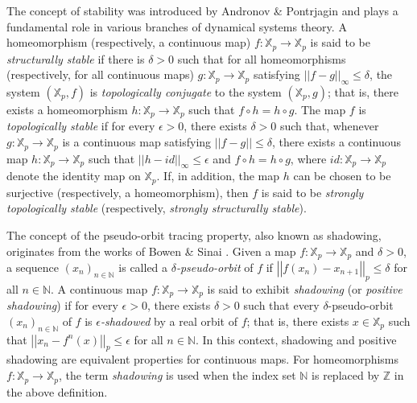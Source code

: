 \documentclass[a4paper, 12pt]{article}
\theoremstyle{definition}
\begin{document}
	
	\smallskip
	The concept of stability was introduced by Andronov \& Pontrjagin \cite{Andronov_Pontrjagin-Systemes_Grossiers} and plays a fundamental role in various branches of dynamical systems theory. 
	A homeomorphism (respectively, a continuous map) $ f: \mathbb{X}_{p} \to \mathbb{X}_{p}$ is said to be \textit{structurally stable} if there is $\delta > 0$ such that for all homeomorphisms (respectively, for all continuous maps) $g: \mathbb{X}_{p} \to \mathbb{X}_{p}$ satisfying $ \left| \left|  f - g  \right|  \right|_{ \infty } \le \delta$, the system $ \left(  \mathbb{X}_{p}, f  \right) $ is \textit{topologically conjugate} to the system $ \left(  \mathbb{X}_{p}, g  \right) $; that is, there exists a homeomorphism $h: \mathbb{X}_{p} \to \mathbb{X}_{p}$ such that $f \circ h= h \circ g$. 
	The map $f$ is \textit{topologically stable} if for every $ \epsilon  > 0$, there exists $\delta  > 0$ such that, whenever $g: \mathbb{X}_{p} \to \mathbb{X}_{p}$ is a continuous map satisfying $ \left| \left|  f - g  \right| \right|  \le \delta$, there exists a continuous map $h: \mathbb{X}_{p} \to \mathbb{X}_{p}$ such that $ \left| \left|  h - id  \right|  \right|_{ \infty } \le  \epsilon $ and $ f \circ h = h \circ g$, where $id: \mathbb{X}_{p} \to \mathbb{X}_{p}$ denote the identity map on $\mathbb{X}_{p}$. 
	If, in addition, the map $h$ can be chosen to be surjective (respectively, a homeomorphism), then $f$ is said to be \textit{strongly topologically stable} (respectively, \textit{strongly structurally stable}). 
	
	\smallskip
	
	The concept of the pseudo-orbit tracing property, also known as shadowing, originates from the works of Bowen \cite{Bowen-Omega-limit_Sets_for_Axiom-A_Diffeomorphisms} \& Sinai \cite{Sinai-Gibbs_Measures_in_Ergodic_Theory}. Given a map $f: \mathbb{X}_{p} \to \mathbb{X}_{p}$ and $\delta  > 0$, a sequence $ \left(  x_{n}   \right)_{n \in \mathbb{N} }$ is called a \textit{$\delta$-pseudo-orbit} of $f$ if $ \left| \left|  f \left(  x_{n}  \right)  - x_{n+1}  \right|  \right|_{p} \le \delta $ for all $ n \in \mathbb{N} $.   
	A continuous map $f: \mathbb{X}_{p} \to \mathbb{X}_{p} $ is said to exhibit \textit{shadowing} (or \textit{positive shadowing}) if for every $\epsilon > 0$, there exists $\delta > 0$ such 
	that every $\delta$-pseudo-orbit $ \left(  x_n   \right)_{n \in\mathbb{N} }$ of $f$ is \textit{$\epsilon$-shadowed} by a real orbit of $f$; that is, there exists 
	$x \in \mathbb{X}_{p}$ such that $  \left| \left|  x_{n} - f^{n} \left(  x  \right)   \right|  \right|_{p} \leq \epsilon $ for all  $n \in \mathbb{N} $. 
	In this context, shadowing and positive shadowing are equivalent properties for continuous maps. 
	For homeomorphisms $f: \mathbb{X}_{p} \to \mathbb{X}_{p}$, the term \textit{shadowing} is used when the index set $\mathbb{N} $ is replaced by $\mathbb{Z} $ in the above definition. 
	
\end{document}
